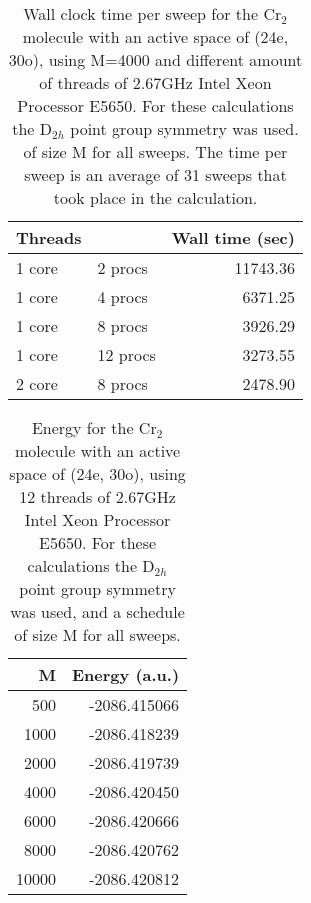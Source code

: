 \documentclass[letterpaper,12pt,notitlepage]{article}
\begin{document}
\begin{table}
		\begin{center}
	\begin{tabular}{llr}
  \hline
  \hline
  Threads && Wall time (sec)\\
  \hline
1 core &2 procs  &11743.36\\
1 core &4 procs  &6371.25\\
1 core &8 procs  &3926.29\\
1 core &12 procs &3273.55\\
2 core &8 procs  &2478.90\\
  \hline
  \hline
	\end{tabular}
		\end{center}
	\caption{Wall clock time per sweep for the Cr$_2$ molecule with an
	active space of (24e, 30o), using M=4000 and different amount of
	threads of 2.67GHz Intel Xeon Processor E5650. For these calculations
	the D$_{2h}$ point group symmetry was used.  of size M for all sweeps.
	The time per sweep is an average of 31 sweeps that took place in the
	calculation.} \label{tab:timingthread}
\end{table}
\begin{table}
\begin{center}
 \begin{tabular}{rr}
  \hline
  \hline
M& Energy (a.u.)\\
\hline
500     &-2086.415066\\
1000	&-2086.418239\\
2000	&-2086.419739\\
4000	&-2086.420450\\
6000	&-2086.420666\\
8000	&-2086.420762\\
10000	&-2086.420812\\
\hline
  \hline
 \end{tabular}
\end{center}
\caption{Energy for  the Cr$_2$ molecule with an active space
of (24e, 30o), using 12 threads of 2.67GHz Intel Xeon Processor E5650. For
these calculations the D$_{2h}$ point group symmetry was used, and a schedule
of size M for all sweeps. } \label{tab:timing}
\end{table}
\end{document}
